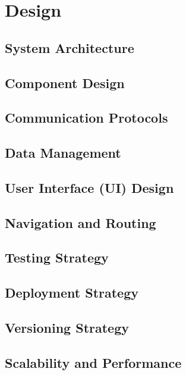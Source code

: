 \chapter{Design}
\label{chap:Design}

\section{System Architecture}
\section{Component Design}
\section{Communication Protocols}
\section{Data Management}
\section{User Interface (UI) Design}
\section{Navigation and Routing}
\section{Testing Strategy}
\section{Deployment Strategy}
\section{Versioning Strategy}
\section{Scalability and Performance}